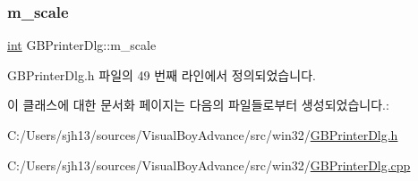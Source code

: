 \subsubsection{\texorpdfstring{m\+\_\+scale}{m\_scale}}
{\footnotesize\ttfamily \mbox{\hyperlink{_util_8cpp_a0ef32aa8672df19503a49fab2d0c8071}{int}} G\+B\+Printer\+Dlg\+::m\+\_\+scale}



G\+B\+Printer\+Dlg.\+h 파일의 49 번째 라인에서 정의되었습니다.



이 클래스에 대한 문서화 페이지는 다음의 파일들로부터 생성되었습니다.\+:\begin{DoxyCompactItemize}
\item 
C\+:/\+Users/sjh13/sources/\+Visual\+Boy\+Advance/src/win32/\mbox{\hyperlink{_g_b_printer_dlg_8h}{G\+B\+Printer\+Dlg.\+h}}\item 
C\+:/\+Users/sjh13/sources/\+Visual\+Boy\+Advance/src/win32/\mbox{\hyperlink{_g_b_printer_dlg_8cpp}{G\+B\+Printer\+Dlg.\+cpp}}\end{DoxyCompactItemize}
